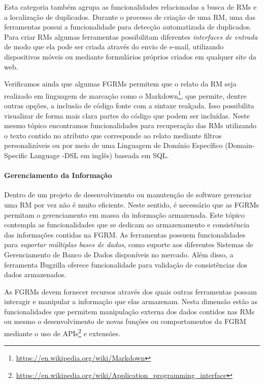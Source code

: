 Esta categoria também agrupa as funcionalidades relacionadas a busca de RMs e a
localização de duplicados. Durante o processo de criação de uma RM, uma das
ferramentas possui a funcionalidade para detecção automatizada de duplicados.
Para criar RMs algumas ferramentas possibilitam diferentes \textit{interfaces de
    entrada} de modo que ela pode ser criada através do envio de e-mail,
utilizando dispositivos móveis ou mediante formulários próprios criados em
qualquer site da web.

Verificamos ainda que algumas FGRMs permitem que o relato da RM seja realizado
em linguagem de marcação como o
Markdown\footnote{\url{https://en.wikipedia.org/wiki/Markdown}}, que permite,
dentre outras opções, a inclusão de código fonte com a sintaxe realçada. Isso
possibilita visualizar de forma mais clara partes do código que podem ser
incluídas. Neste mesmo tópico encontramos funcionalidades para recuperação das
RMs utilizando o texto contido no atributo que corresponde ao relato mediante
filtros personalizáveis ou por meio de uma Linguagem de Domínio Específico
(Domain-Specific Language \@-\@ DSL em inglês) baseada em SQL\@.

\paragraph{Gerenciamento da Informação}
\label{par:gerenciamento_da_informação}

Dentro de um projeto de desenvolvimento ou manutenção de software gerenciar uma
RM por vez não é muito eficiente. Neste sentido, é necessário que as FGRMs
permitam o gerenciamento em massa da informação armazenada. Este tópico
contempla as funcionalidades que se dedicam ao armazenamento e consistência das
informações contidas na FGRM\@. As ferramentas possuem funcionalidades para
\textit{suportar múltiplas bases de dados}, como suporte aos diferentes Sistemas
de Gerenciamento de Banco de Dados disponíveis no mercado. Além disso, a
ferramenta Bugzilla oferece funcionalidade para validação de consistências dos
dados armazenados.

As FGRMs devem fornecer recursos através dos quais outras ferramentas possam
interagir e manipular a informação que elas armazenam. Nesta dimensão estão as
funcionalidades que permitem manipulação externa dos dados contidos nas RMs ou
mesmo o desenvolvimento de novas funções ou comportamentos da FGRM mediante o
uso de
APIs\footnote{\url{https://en.wikipedia.org/wiki/Application_programming_interface}}
e extensões.

